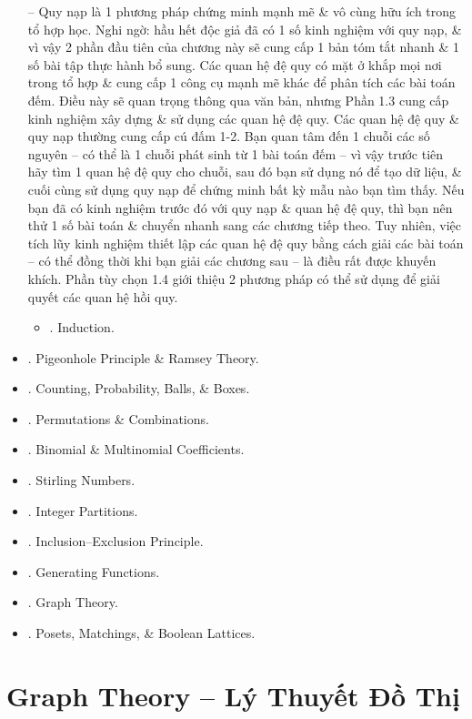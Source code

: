\documentclass{article}
\begin{document}
\begin{itemize}
	-- Quy nạp là 1 phương pháp chứng minh mạnh mẽ \& vô cùng hữu ích trong tổ hợp học. Nghi ngờ: hầu hết độc giả đã có 1 số kinh nghiệm với quy nạp, \& vì vậy 2 phần đầu tiên của chương này sẽ cung cấp 1 bản tóm tắt nhanh \& 1 số bài tập thực hành bổ sung. Các quan hệ đệ quy có mặt ở khắp mọi nơi trong tổ hợp \& cung cấp 1 công cụ mạnh mẽ khác để phân tích các bài toán đếm. Điều này sẽ quan trọng thông qua văn bản, nhưng Phần 1.3 cung cấp kinh nghiệm xây dựng \& sử dụng các quan hệ đệ quy. Các quan hệ đệ quy \& quy nạp thường cung cấp cú đấm 1-2. Bạn quan tâm đến 1 chuỗi các số nguyên -- có thể là 1 chuỗi phát sinh từ 1 bài toán đếm -- vì vậy trước tiên hãy tìm 1 quan hệ đệ quy cho chuỗi, sau đó bạn sử dụng nó để tạo dữ liệu, \& cuối cùng sử dụng quy nạp để chứng minh bất kỳ mẫu nào bạn tìm thấy. Nếu bạn đã có kinh nghiệm trước đó với quy nạp \& quan hệ đệ quy, thì bạn nên thử 1 số bài toán \& chuyển nhanh sang các chương tiếp theo. Tuy nhiên, việc tích lũy kinh nghiệm thiết lập các quan hệ đệ quy bằng cách giải các bài toán -- có thể đồng thời khi bạn giải các chương sau -- là điều rất được khuyến khích. Phần tùy chọn 1.4 giới thiệu 2 phương pháp có thể sử dụng để giải quyết các quan hệ hồi quy.
	\begin{itemize}
		\item {. Induction.} 
	\end{itemize}
	\item {. Pigeonhole Principle \& Ramsey Theory.}
	\item {. Counting, Probability, Balls, \& Boxes.}
	\item {. Permutations \& Combinations.}
	\item {. Binomial \& Multinomial Coefficients.}
	\item {. Stirling Numbers.}
	\item {. Integer Partitions.}
	\item {. Inclusion--Exclusion Principle.}
	\item {. Generating Functions.}
	\item {. Graph Theory.}
	\item {. Posets, Matchings, \& Boolean Lattices.}
\end{itemize}


\section{Graph Theory -- Lý Thuyết Đồ Thị}
\end{document}
